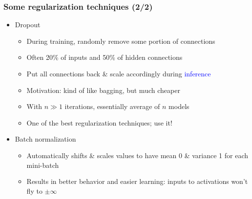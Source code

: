 \begin{frame}
    \frametitle{Some regularization techniques (2/2)}
    \begin{itemize}
        \item<+-> \alert{Dropout} \citep{SrivastavaJMLR14}
        \begin{itemize}[<.->]
            \item During \textcolor{Green4}{training}, randomly remove some portion of connections
            \item Often 20\% of inputs and 50\% of hidden connections
            \item<+-> Put all connections back \& scale accordingly during \textcolor{blue}{inference}
            \item<+-> Motivation: kind of like bagging, but much cheaper
            \item With $n \gg 1$ iterations, essentially average of $n$ models
            \item One of the best regularization techniques; use it!
        \end{itemize}
    \end{itemize}

    
    \hfill
    
    \hfill
    
    \hfill

    \begin{itemize}
        \item \alert{Batch normalization} \citep{IoffeICML15}
        \begin{itemize}
            \item Automatically shifts \& scales values to have mean 0 \& variance 1 for each mini-batch
            \item Results in better behavior and easier learning: inputs to activations won't fly to $\pm \infty$
        \end{itemize}
    \end{itemize}
\end{frame}

